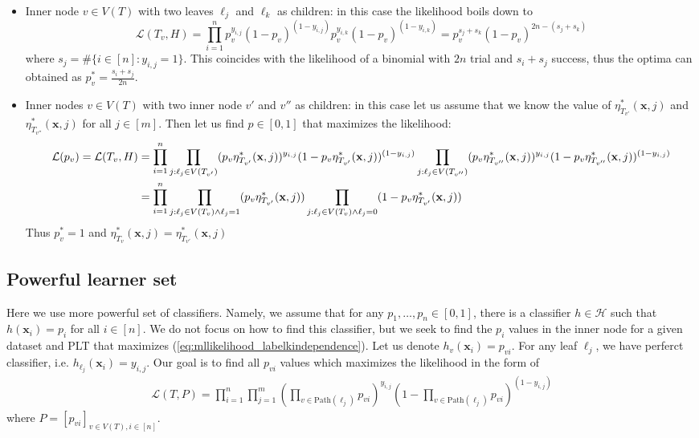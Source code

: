 \documentclass{article}
\newcommand{\cH}{\mathcal{H}}
\newcommand{\cL}{\mathcal{L}}
\newcommand{\path}{\text{Path}}
\newcommand{\bx}{\mathbf{x}}
\newcommand{\Algo}[1]{\textsc{#1}}
\begin{document}
\begin{itemize}
    \item Inner node $v\in V(T)$ with two leaves $\ell_j$ and $\ell_k$ as children: in this case the likelihood boils down to
    \[
    \cL ( T_v, H ) = \prod_{i=1}^{n} p_v^{y_{i,j}} (1-p_v)^{(1-y_{i,j})}p_v^{y_{i,k}} (1-p_v)^{(1-y_{i,k})} = p_v^{s_j+s_k} (1-p_v)^{2n-(s_j+s_k)}
    \]
    where $s_j = \# \{ i \in [n] : y_{i,j}=1\}$. This coincides with the likelihood of a binomial with $2n$ trial and $s_i+s_j$ success, thus the optima can obtained as $p^{*}_v=\tfrac{s_i+s_j}{2n}$.
    \item Inner nodes $v\in V(T)$ with two inner node $v'$ and $v''$ as children: in this case let us assume that we know the value of $\eta_{T_{v'}}^* (\bx , j)$ and $\eta_{T_{v''}}^* (\bx , j)$ for all $j\in [m]$. Then let us find $p\in[0,1]$ that maximizes the likelihood:
    \begin{align}
    \cL (p_v) = \cL ( T_v, H ) & = \prod_{i=1}^{n} \prod_{j : \ell_j \in V(T_{v'}) } (p_v\eta_{T_{v'}}^* (\bx , j))^{y_{i,j}} (1-p_v\eta_{T_{v'}}^* (\bx , j))^{(1-y_{i,j})} \prod_{j : \ell_j \in V(T_{v''}) } (p_v\eta_{T_{v''}}^* (\bx , j))^{y_{i,j}} (1-p_v \eta_{T_{v''}}^* (\bx , j))^{(1-y_{i,j})}
    \notag\\
    & = \prod_{i=1}^{n} \prod_{j : \ell_j \in V(T_{v}) \wedge \ell_j=1 } (p_v \eta_{T_{v'}}^* (\bx , j)) \prod_{j : \ell_j \in V(T_{v}) \wedge \ell_j=0 } (1-p_v\eta_{T_{v'}}^* (\bx , j))  \notag
    \end{align}
    Thus $p^*_v=1$ and $\eta_{T_{v}}^* (\bx , j)= \eta_{T_{v'}}^* (\bx , j)$
\end{itemize}



\subsection{Powerful learner set}

Here we use more powerful set of classifiers. Namely, we assume that for any $p_1, \dots ,p_n \in [0,1]$, there is a classifier $h\in \cH$ such that $h(\bx_i)=p_i$ for all $i\in [n]$. We do not focus on how to find this classifier, but we seek to find the $p_i$ values in the inner node for a given dataset and \Algo{PLT} that maximizes (\ref{eq:mllikelihood_labelkindependence}). Let us denote $h_v(\bx_i) = p_{vi}$. For any leaf $\ell_j$, we have perferct classifier, i.e. $h_{\ell_j} (\bx_i ) = y_{i,j}$. Our goal is to find all $p_{vi}$ values which maximizes the likelihood in the form of
\begin{align}
\cL ( T, P ) = \prod_{i=1}^{n} \prod_{j=1}^m \left( \prod_{v \in \path(\ell_j)} p_{vi} \right)^{y_{i,j}} \left(1-\prod_{v \in \path(\ell_j)} p_{vi} \right)^{(1-y_{i,j})}
\end{align}
where $P=[p_{vi}]_{v\in V(T) , i \in [n]}$.
\end{document}
